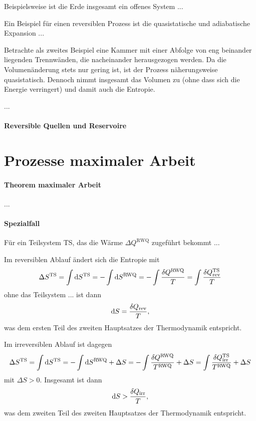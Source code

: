 Beispielsweise ist die Erde insgesamt ein offenes System ... 


Ein Beispiel für einen reversiblen Prozess ist die quasistatische und adiabatische Expansion 
... 

Betrachte als zweites Beispiel eine Kammer mit einer Abfolge von eng beinander liegenden Trennwänden, die nacheinander herausgezogen werden. Da die Volumenänderung stets nur gering ist, ist der Prozess näherungsweise quasistatisch. Dennoch nimmt insgesamt das Volumen zu (ohne dass sich die Energie verringert) und damit auch die Entropie. 


... 


\paragraph*{Reversible Quellen und Reservoire}


\section{Prozesse maximaler Arbeit}

\paragraph*{Theorem maximaler Arbeit}

... 

\paragraph*{Spezialfall}

Für ein Teilsystem TS, das die Wärme $\Delta Q^{\mathrm{RWQ}}$ zugeführt bekommt ... 

Im reversiblen Ablauf ändert sich die Entropie mit 
\begin{align*}
    \Delta S^{\mathrm{TS}} = \int \mathop{}\!\mathrm{d} S^\mathrm{TS} = -\int \mathop{}\!\mathrm{d} S^\mathrm{RWQ} = - \int \frac{\mathop{}\!\delta Q^\mathrm{RWQ}}{T} = \int \frac{\mathop{}\!\delta Q^\mathrm{TS}_\mathrm{rev}}{T} 
\end{align*}
ohne das Teilsystem ... ist dann 
\begin{align}
    \label{eq:2.HS_teil1}
    \mathop{}\!\mathrm{d} S = \frac{\mathop{}\!\delta Q_\mathrm{rev}}{T},
\end{align}
was dem ersten Teil des zweiten Hauptsatzes der Thermodynamik entspricht. 

Im irreversiblen Ablauf ist dagegen 
\begin{align*}
    \Delta S^{\mathrm{TS}} = \int \mathop{}\!\mathrm{d} S^\mathrm{TS} = -\int \mathop{}\!\mathrm{d} S^\mathrm{RWQ} +\Delta S = - \int \frac{\mathop{}\!\delta Q^\mathrm{RWQ}}{T^\mathrm{RWQ}} + \Delta S = \int \frac{\mathop{}\!\delta Q^\mathrm{TS}_\mathrm{irr}}{T^\mathrm{RWQ}} +\Delta S
\end{align*}
mit $\Delta S>0$. Insgesamt ist dann 
\begin{align}
    \label{eq:2.HS_teil2}
    \mathop{}\!\mathrm{d} S > \frac{\mathop{}\!\delta Q_\mathrm{irr}}{T},
\end{align}
was dem zweiten Teil des zweiten Hauptsatzes der Thermodynamik entspricht. 


